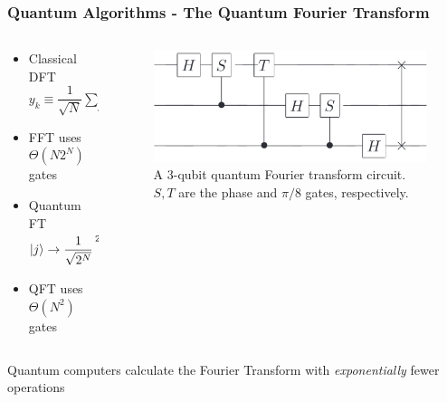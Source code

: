 \documentclass[aspectratio=169]{beamer}
\begin{document}
\begin{frame}
    \frametitle{Quantum Algorithms - The Quantum Fourier Transform}
    \begin{columns}
        \begin{column}{0.5\textwidth}
            \begin{itemize}
                \item Classical DFT $y_k \equiv \dfrac{1}{\sqrt{N}} \sum\limits_{j = 0}^{N - 1} e^{2 \pi i j k / N} x_j$
                \item FFT uses $\Theta(N 2^N)$ gates
                \item Quantum FT $\ket{j} \to \dfrac{1}{\sqrt{2^N}} \sum\limits_{k = 0}^{2^N - 1} e^{2 \pi i j k / 2^N} \ket{k}$
                \item QFT uses $\Theta(N^2)$ gates
            \end{itemize}
        \end{column}
        \begin{column}{0.5\textwidth}
            \begin{figure}
                \centering
                \includegraphics[width=\textwidth]{images/QFT_3bit.png}
                \caption{A 3-qubit quantum Fourier transform circuit.  $S,T$ are the phase and $\pi/8$ gates, respectively.}
            \end{figure}
        \end{column}
    \end{columns}
    \begin{alertblock}{}
        \centering Quantum computers calculate the Fourier Transform with \emph{exponentially} fewer operations
    \end{alertblock}
\end{frame}

            
\end{document}
